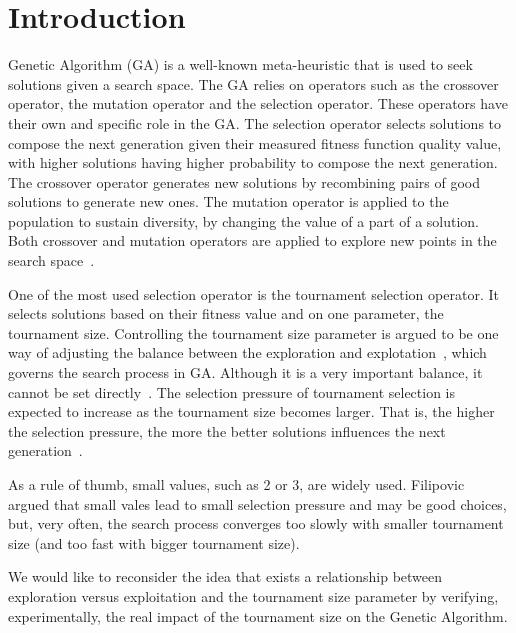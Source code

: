 \section{Introduction}\label{intro}

 Genetic Algorithm (GA) is a well-known meta-heuristic that is used to seek solutions given a search space. The GA relies on operators such as the crossover operator, the mutation operator and the selection operator. These operators have their own and specific role in the GA. The selection operator selects solutions to compose the next generation given their measured fitness function quality value, with higher solutions having higher probability to compose the next generation. The crossover operator generates new solutions by recombining pairs of good solutions to generate new ones. The mutation operator is applied to the population to sustain diversity, by changing the value of a part of a solution. Both crossover and mutation operators are applied to explore new points in the search space~\cite{blickle1995mathematical}.

One of the most used selection operator is the tournament selection operator. It selects solutions based on their fitness value and on one parameter, the tournament size. Controlling the tournament size parameter is argued to be one way of adjusting the balance between the exploration and explotation~\cite{blickle1995mathematical}, which governs the search process in GA. Although it is a very important balance, it cannot be set directly~\cite{filipovic2012fine}. The selection pressure of tournament selection is expected to increase as the tournament size becomes larger. That is, the higher the selection pressure, the more the better solutions influences the next generation~\cite{miller1995genetic}. 

As a rule of thumb, small values, such as 2 or 3, are widely used. Filipovic~\cite{filipovic2012fine} argued that small vales lead to small selection pressure and may be good choices, but, very often, the search process converges too slowly with smaller tournament size (and too fast with bigger tournament size). 

 
 We would like to reconsider the idea that exists a relationship between exploration versus exploitation and the tournament size parameter by verifying, experimentally, the real impact of the tournament size on the Genetic Algorithm.
 
